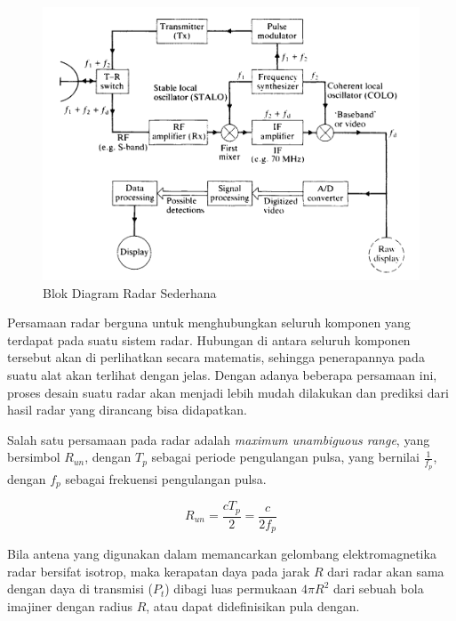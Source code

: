 \begin{figure}
	\begin{center}
		\includegraphics[scale=0.35]{pics/bab2/blokdiagram.png} 
		\caption[Blok Diagram Radar]{{Blok Diagram Radar Sederhana \cite{Kingsley1999}}}
		\label{pic:blokdiagram}
	\end{center}
\end{figure}

Persamaan radar berguna untuk menghubungkan seluruh komponen yang terdapat pada suatu sistem radar. Hubungan di antara seluruh komponen tersebut akan di perlihatkan secara matematis, sehingga penerapannya pada suatu alat akan terlihat dengan jelas. Dengan adanya beberapa persamaan ini, proses desain suatu radar akan menjadi lebih mudah dilakukan dan prediksi dari hasil radar yang dirancang bisa didapatkan.

Salah satu persamaan pada radar adalah \textit{maximum unambiguous range}, yang bersimbol $R_{un}$, dengan $T_{p}$ sebagai periode pengulangan pulsa, yang bernilai $\frac{1}{f_{p}}$, dengan $f_{p}$ sebagai frekuensi pengulangan pulsa.

\begin{equation}
	R_{un} = \frac{cT_{p}}{2} = \frac{c}{2f_{p}}
\end{equation}

Bila antena yang digunakan dalam memancarkan gelombang elektromagnetika radar bersifat isotrop, maka kerapatan daya pada jarak $R$ dari radar akan sama dengan daya di transmisi ($P_{t}$) dibagi luas permukaan $4\pi R^{2}$ dari sebuah bola imajiner dengan radius $R$, atau dapat didefinisikan pula dengan.

